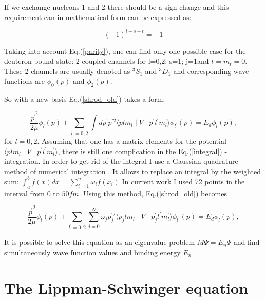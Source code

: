     If we exchange nucleons 1 and 2 there should be a sign change and this requirement 
    can in mathematical form can be expressed as:

    \begin{equation}
        (-1)^{l+s+t} = -1
        \label{parity}
    \end{equation}

    Taking into account Eq.(\ref{parity}), one can find only one possible case for 
    the deuteron bound state: 2 coupled channels for l=0,2; s=1; j=1and $t = m_t = 0$. 
    These 2 channels are usually denoted as $^3S_1$ and $^3D_1$ and
    corresponding wave functions are $\phi_0(p)$ and $\phi_2(p)$. 

    So with a new basis Eq.(\ref{shrod_old}) takes a form:

    \begin{equation}
        \frac{\vec{p}^2}{2\mu} \phi_l(p) +
        \sum_{l^\prime =0,2} \int d p^\prime p^{\prime 2} 
        \langle plm_l \mid V \mid p^\prime l^\prime m_l^\prime  \rangle
        \phi_{l^\prime}(p) = 
        E_d \phi_l(p),
        \label{integral}
    \end{equation}
    for $l=0,2$. Assuming that one has a matrix elements for the potential 
    $\langle plm_l \mid V \mid p^\prime l^\prime m_l^\prime  \rangle$,
    there is still one complication in the Eq.(\ref{integral}) - integration.
    In order to get rid of the integral I use a Gaussian quadrature 
    method of numerical integration \cite{jacobi1826ueber}.
    It allows to replace an integral by the weighted sum:
        $\int_a^b f(x)dx = \sum_{i=1}^n \omega_i f(x_i)$
    In current work I used 72 points in the interval from $0$ to $50 fm$. 
    Using this method, Eq.(\ref{shrod_old}) becomes  

    
    \begin{equation}
        \frac{\vec{p}^2}{2\mu} \phi_l(p) +
        \sum_{l^\prime =0,2}\sum_{j =0}^N  \omega_j p^{\prime 2}_j \langle p_jlm_l \mid V \mid p^\prime_j l^\prime m_l^\prime  \rangle
        \phi_{l^\prime}(p) = 
        E_d \phi_l(p),
        \label{integral2}
    \end{equation}

    It is possible to solve this equation as an eigenvalue problem $M\Psi = E_n \Psi$ and
    find simultaneously wave function values and binding energy $E_n$.

\section{The Lippman-Schwinger equation}


